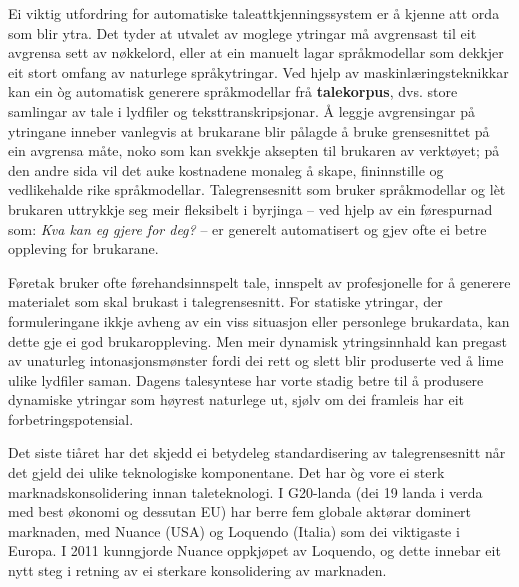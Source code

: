 \begin{multicols}{2}
Ei viktig utfordring for automatiske taleattkjenningssystem er å kjenne att orda som blir ytra. Det tyder at utvalet av moglege ytringar må avgrensast til eit avgrensa sett av nøkkelord, eller at ein manuelt lagar språkmodellar som dekkjer eit stort omfang av naturlege språkytringar. Ved hjelp av maskinlæringsteknikkar kan ein òg automatisk generere språkmodellar frå \textbf{talekorpus}, dvs. store samlingar av tale i lydfiler og teksttranskripsjonar. Å leggje avgrensingar på ytringane inneber vanlegvis at brukarane blir pålagde å bruke grensesnittet på ein avgrensa måte, noko som kan svekkje aksepten til brukaren av verktøyet; på den andre sida vil det auke kostnadene monaleg å skape, fininnstille og vedlikehalde rike språkmodellar. Talegrensesnitt som bruker språkmodellar og lèt brukaren uttrykkje seg meir fleksibelt i byrjinga – ved hjelp av ein førespurnad som: \textit{Kva kan eg gjere for deg?} – er generelt automatisert og gjev ofte ei betre oppleving for brukarane.


Føretak bruker ofte førehandsinnspelt tale, innspelt av profesjonelle for å generere materialet som skal brukast i talegrensesnitt. For statiske ytringar, der formuleringane ikkje avheng av ein viss situasjon eller personlege brukardata, kan dette gje ei god brukaroppleving. Men meir dynamisk ytringsinnhald kan pregast av unaturleg intonasjonsmønster fordi dei rett og slett blir produserte ved å lime ulike lydfiler saman. Dagens talesyntese har vorte stadig betre til å produsere dynamiske ytringar som høyrest naturlege ut, sjølv om dei framleis har eit forbetringspotensial. 

Det siste tiåret har det skjedd ei betydeleg standardisering av talegrensesnitt når det gjeld dei ulike teknologiske komponentane. Det har òg vore ei sterk marknadskonsolidering innan taleteknologi. I G20-landa (dei 19 landa i verda med best økonomi og dessutan EU) har berre fem globale aktørar dominert marknaden, med Nuance (USA) og Loquendo (Italia) som dei viktigaste i Europa. I 2011 kunngjorde Nuance oppkjøpet av Loquendo, og dette innebar eit nytt steg i retning av ei sterkare konsolidering av marknaden. 


\end{multicols}
